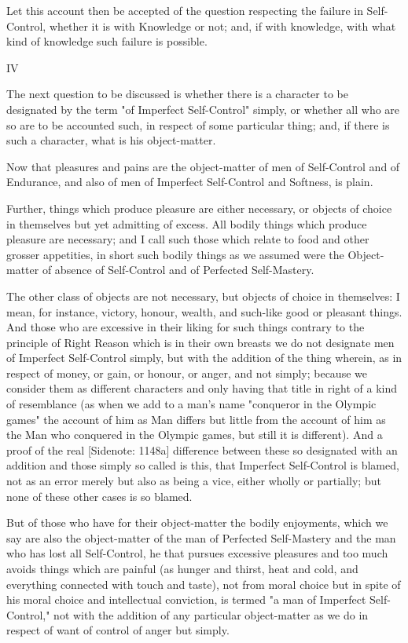 Let this account then be accepted of the question respecting the failure
in Self-Control, whether it is with Knowledge or not; and, if with
knowledge, with what kind of knowledge such failure is possible.

IV

The next question to be discussed is whether there is a character to be
designated by the term "of Imperfect Self-Control" simply, or whether
all who are so are to be accounted such, in respect of some particular
thing; and, if there is such a character, what is his object-matter.

Now that pleasures and pains are the object-matter of men of
Self-Control and of Endurance, and also of men of Imperfect Self-Control
and Softness, is plain.

Further, things which produce pleasure are either necessary, or objects
of choice in themselves but yet admitting of excess. All bodily things
which produce pleasure are necessary; and I call such those which relate
to food and other grosser appetities, in short such bodily things as
we assumed were the Object-matter of absence of Self-Control and of
Perfected Self-Mastery.

The other class of objects are not necessary, but objects of choice in
themselves: I mean, for instance, victory, honour, wealth, and such-like
good or pleasant things. And those who are excessive in their liking for
such things contrary to the principle of Right Reason which is in their
own breasts we do not designate men of Imperfect Self-Control simply,
but with the addition of the thing wherein, as in respect of money, or
gain, or honour, or anger, and not simply; because we consider them as
different characters and only having that title in right of a kind of
resemblance (as when we add to a man's name "conqueror in the Olympic
games" the account of him as Man differs but little from the account
of him as the Man who conquered in the Olympic games, but still it is
different). And a proof of the real [Sidenote: 1148a] difference between
these so designated with an addition and those simply so called is this,
that Imperfect Self-Control is blamed, not as an error merely but also
as being a vice, either wholly or partially; but none of these other
cases is so blamed.

But of those who have for their object-matter the bodily enjoyments,
which we say are also the object-matter of the man of Perfected
Self-Mastery and the man who has lost all Self-Control, he that pursues
excessive pleasures and too much avoids things which are painful (as
hunger and thirst, heat and cold, and everything connected with touch
and taste), not from moral choice but in spite of his moral choice and
intellectual conviction, is termed "a man of Imperfect Self-Control,"
not with the addition of any particular object-matter as we do in
respect of want of control of anger but simply.

